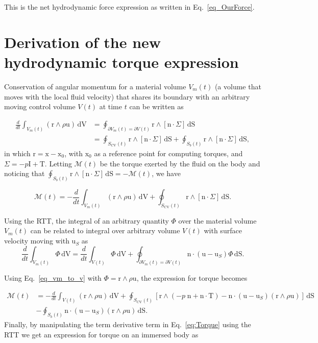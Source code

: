 \documentclass[review]{elsarticle}
\renewcommand{\vec}[1]{\bm{\mathrm{#1}}}
\def \x{\vec{x}}
\def \n{\vec{n}}
\def \r{\vec{r}}
\def \u{\vec{u}}
\def \uS{\vec{u}_S}
\def \I{\vec{I}}
\def \T{\vec{T}}
\def \cM{\vec{\mathcal{M}}}
\def \Sbt{S_b(t)}
\def  \Scvt{S_\text{CV}(t)}
\def \Vt{V(t)}
\def \Vmt{V_m(t)}
\def \I{\vec{I}}
\def \n{\vec{n}}
\def \u{\vec{u}}
\def \x{\vec{x}}
\def \dS{\,\mathrm{dS}}
\def \dV{\,\mathrm{dV}}
\def \ndot{\n \cdot}
\def \rcross{\r \wedge}
\begin{document}
\noindent This is the net hydrodynamic force expression as written in Eq.~\eqref{eq_OurForce}.


\section{Derivation of the new hydrodynamic torque expression} \label{app_torque}
Conservation of angular momentum for a material volume $\Vmt$ (a volume 
that moves with the local fluid velocity) that shares its boundary with 
an arbitrary moving control volume $\Vt$ at time $t$ can be written as~\cite{Kundu14,Pozrikidis11}

\begin{align}
	\frac{d}{dt} \int_{\Vmt} (\rcross \rho \u) \dV &= \oint_{\partial \Vmt = \partial \Vt}   \rcross [ \ndot \Sigma] \dS \nonumber \\ 
	 &=  \oint_{\Scvt} \rcross [ \ndot \Sigma ] \dS + \oint_{\Sbt} \rcross [ \ndot \Sigma ] \dS,
\end{align}
in which $\r = \x - \x_{0}$, with $\x_{0}$ as a reference point for computing torques,
and $\Sigma = -p\I + \T$.
Letting $\cM(t)$ be the torque exerted by the fluid on the body and noticing that 
$\oint_{\Sbt}  \rcross [ \ndot \Sigma] \dS = -\cM(t)$, we have

\begin{equation}
	\cM(t) = -\frac{d}{dt} \int_{\Vmt} (\rcross \rho \u) \dV + \oint_{\Scvt}  \rcross [ \ndot \Sigma ] \dS. 
\end{equation}

\noindent Using the RTT, the integral of an arbitrary quantity $\Phi$ over the material volume 
$\Vmt$ can be related to integral over arbitrary volume $\Vt$ with surface velocity moving with $\uS$ as
\begin{equation}
 \frac{d}{dt} \int_{\Vmt} \Phi \dV =\frac{d}{dt} \int_{\Vt} \Phi \dV 
 + \oint_{\partial \Vmt = \partial \Vt} \ndot (\u-\uS) \Phi \dS. \label{eq_vm_to_v}
 \end{equation} 

\noindent Using Eq.~\eqref{eq_vm_to_v} with $\Phi = \rcross \rho \u$, the expression 
for torque becomes

\begin{align}
	\cM(t) &= -\frac{d}{dt} \int_{\Vt} (\rcross \rho \u) \dV 
	 + \oint_{\Scvt} [\rcross (- p \; \n +  \ndot \T) - \ndot (\u-\uS) (\rcross \rho \u)  ] \dS \nonumber \\
	 & - \oint_{\Sbt} \ndot (\u - \uS)(\rcross \rho \u) \dS. \label{eq:Torque}
\end{align}
Finally, by manipulating the term derivative term in 
Eq.~\eqref{eq:Torque} using the RTT we get an expression for torque on an immersed 
body as 
\end{document}
